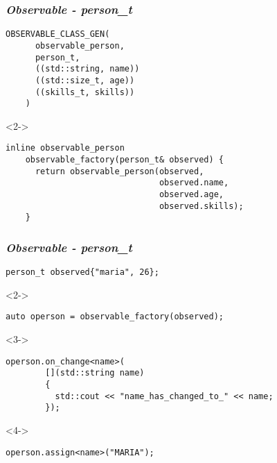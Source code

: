 \documentclass[t]{beamer}
\begin{document}
\begin{frame}[fragile]
  \frametitle{\textit{Observable - person\_t}}
  \begin{lstlisting}[basicstyle=\small]
    OBSERVABLE_CLASS_GEN(
      observable_person,
      person_t,
      ((std::string, name))
      ((std::size_t, age))
      ((skills_t, skills))
    )
  \end{lstlisting}

  \begin{onlyenv}<2->
  \begin{lstlisting}[basicstyle=\small]
    inline observable_person 
    observable_factory(person_t& observed) {
      return observable_person(observed, 
                               observed.name, 
                               observed.age,
                               observed.skills);
    }
  \end{lstlisting}
  \end{onlyenv}
\end{frame}

\begin{frame}[fragile]
  \frametitle{\textit{Observable - person\_t}}
  \begin{lstlisting}[basicstyle=\small,escapeinside=`']
    person_t observed{"maria", 26};
  \end{lstlisting}

  \begin{onlyenv}<2->
  \begin{lstlisting}[basicstyle=\small]
    auto operson = observable_factory(observed);
  \end{lstlisting}
  \end{onlyenv}

  \begin{onlyenv}<3->
  \begin{lstlisting}[basicstyle=\small]
    operson.on_change<name>(
        [](std::string name)
        {
          std::cout << "name_has_changed_to_" << name;
        });
  \end{lstlisting}
  \end{onlyenv}

  \begin{onlyenv}<4->
  \begin{lstlisting}[basicstyle=\small]
    operson.assign<name>("MARIA");
  \end{lstlisting}
  \end{onlyenv}
\end{frame}
\end{document}
